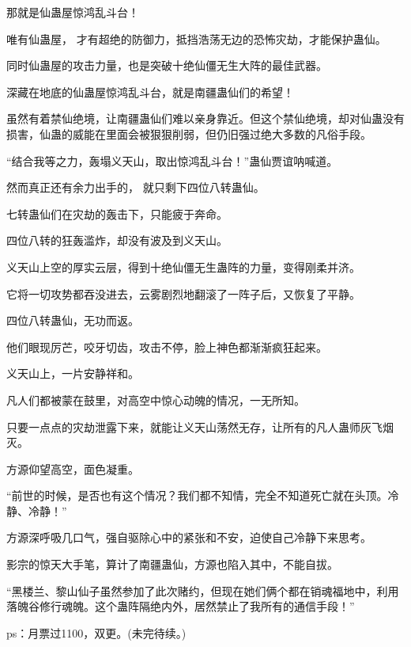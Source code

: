 \begin{this_body}
那就是仙蛊屋惊鸿乱斗台！

唯有仙蛊屋， 才有超绝的防御力，抵挡浩荡无边的恐怖灾劫，才能保护蛊仙。

同时仙蛊屋的攻击力量，也是突破十绝仙僵无生大阵的最佳武器。

深藏在地底的仙蛊屋惊鸿乱斗台，就是南疆蛊仙们的希望！

虽然有着禁仙绝境，让南疆蛊仙们难以亲身靠近。但这个禁仙绝境，却对仙蛊没有损害，仙蛊的威能在里面会被狠狠削弱，但仍旧强过绝大多数的凡俗手段。

“结合我等之力，轰塌义天山，取出惊鸿乱斗台！”蛊仙贾谊呐喊道。

然而真正还有余力出手的， 就只剩下四位八转蛊仙。

七转蛊仙们在灾劫的轰击下，只能疲于奔命。

四位八转的狂轰滥炸，却没有波及到义天山。

义天山上空的厚实云层，得到十绝仙僵无生蛊阵的力量，变得刚柔并济。

它将一切攻势都吞没进去，云雾剧烈地翻滚了一阵子后，又恢复了平静。

四位八转蛊仙，无功而返。

他们眼现厉芒，咬牙切齿，攻击不停，脸上神色都渐渐疯狂起来。

义天山上，一片安静祥和。

凡人们都被蒙在鼓里，对高空中惊心动魄的情况，一无所知。

只要一点点的灾劫泄露下来，就能让义天山荡然无存，让所有的凡人蛊师灰飞烟灭。

方源仰望高空，面色凝重。

“前世的时候，是否也有这个情况？我们都不知情，完全不知道死亡就在头顶。冷静、冷静！”

方源深呼吸几口气，强自驱除心中的紧张和不安，迫使自己冷静下来思考。

影宗的惊天大手笔，算计了南疆蛊仙，方源也陷入其中，不能自拔。

“黑楼兰、黎山仙子虽然参加了此次赌约，但现在她们俩个都在销魂福地中，利用落魄谷修行魂魄。这个蛊阵隔绝内外，居然禁止了我所有的通信手段！”

ps：月票过1100，双更。(未完待续。)

\end{this_body}

